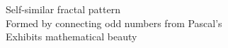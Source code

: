 \documentclass[preview]{standalone}
\begin{document}
Self-similar fractal pattern\\Formed by connecting odd numbers from Pascal's\\Exhibits mathematical beauty\\
\end{document}
